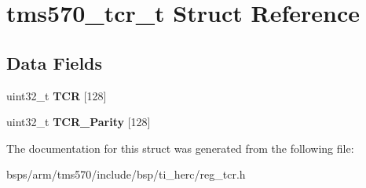 \hypertarget{structtms570__tcr__t}{}\section{tms570\+\_\+tcr\+\_\+t Struct Reference}
\label{structtms570__tcr__t}
\subsection*{Data Fields}
\begin{DoxyCompactItemize}
\item 
\mbox{\label{structtms570__tcr__t_a799601442a0604f6b63c3d1dd05acf24}} 
uint32\+\_\+t {\bfseries T\+CR} \mbox{[}128\mbox{]}
\item 
\mbox{\label{structtms570__tcr__t_a9648d0f995fd1e34029fd38d97d08b4f}} 
uint32\+\_\+t {\bfseries T\+C\+R\+\_\+\+Parity} \mbox{[}128\mbox{]}
\end{DoxyCompactItemize}


The documentation for this struct was generated from the following file\+:\begin{DoxyCompactItemize}
\item 
bsps/arm/tms570/include/bsp/ti\+\_\+herc/reg\+\_\+tcr.\+h\end{DoxyCompactItemize}
